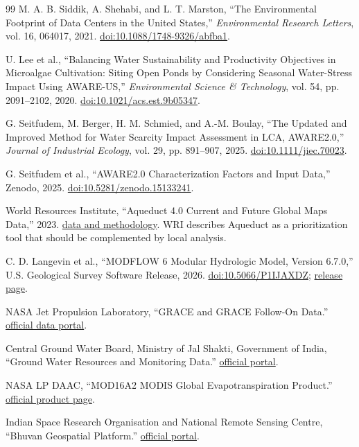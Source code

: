 \documentclass[10pt]{article}
\begin{document}
\begin{thebibliography}{99}
M. A. B. Siddik, A. Shehabi, and L. T. Marston, ``The Environmental Footprint of Data Centers in the United States,'' \emph{Environmental Research Letters}, vol. 16, 064017, 2021. \href{https://doi.org/10.1088/1748-9326/abfba1}{doi:10.1088/1748-9326/abfba1}.

U. Lee et al., ``Balancing Water Sustainability and Productivity Objectives in Microalgae Cultivation: Siting Open Ponds by Considering Seasonal Water-Stress Impact Using AWARE-US,'' \emph{Environmental Science \& Technology}, vol. 54, pp. 2091--2102, 2020. \href{https://doi.org/10.1021/acs.est.9b05347}{doi:10.1021/acs.est.9b05347}.

G. Seitfudem, M. Berger, H. M. Schmied, and A.-M. Boulay, ``The Updated and Improved Method for Water Scarcity Impact Assessment in LCA, AWARE2.0,'' \emph{Journal of Industrial Ecology}, vol. 29, pp. 891--907, 2025. \href{https://doi.org/10.1111/jiec.70023}{doi:10.1111/jiec.70023}.

G. Seitfudem et al., ``AWARE2.0 Characterization Factors and Input Data,'' Zenodo, 2025. \href{https://doi.org/10.5281/zenodo.15133241}{doi:10.5281/zenodo.15133241}.

World Resources Institute, ``Aqueduct 4.0 Current and Future Global Maps Data,'' 2023. \href{https://www.wri.org/data/aqueduct-global-maps-40-data}{data and methodology}. WRI describes Aqueduct as a prioritization tool that should be complemented by local analysis.

C. D. Langevin et al., ``MODFLOW 6 Modular Hydrologic Model, Version 6.7.0,'' U.S. Geological Survey Software Release, 2026. \href{https://doi.org/10.5066/P1IJAXDZ}{doi:10.5066/P1IJAXDZ}; \href{https://www.usgs.gov/software/modflow-version-670}{release page}.

NASA Jet Propulsion Laboratory, ``GRACE and GRACE Follow-On Data.'' \href{https://grace.jpl.nasa.gov/data/get-data/}{official data portal}.

Central Ground Water Board, Ministry of Jal Shakti, Government of India, ``Ground Water Resources and Monitoring Data.'' \href{https://cgwb.gov.in/}{official portal}.

NASA LP DAAC, ``MOD16A2 MODIS Global Evapotranspiration Product.'' \href{https://lpdaac.usgs.gov/products/mod16a2v061/}{official product page}.

Indian Space Research Organisation and National Remote Sensing Centre, ``Bhuvan Geospatial Platform.'' \href{https://bhuvan.nrsc.gov.in/}{official portal}.


\end{thebibliography}
\end{document}
